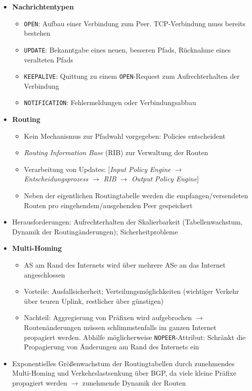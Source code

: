 \begin{itemize}
	\item \textbf{Nachrichtentypen}
	\begin{itemize}
		\item \texttt{OPEN}: Aufbau einer Verbindung zum Peer. TCP-Verbindung muss bereits bestehen
		\item \texttt{UPDATE}: Bekanntgabe eines neuen, besseren Pfads, Rücknahme eines veralteten Pfads
		\item \texttt{KEEPALIVE}: Quittung zu einem \texttt{OPEN}-Request zum Aufrechterhalten der Verbindung
		\item \texttt{NOTIFICATION}: Fehlermeldungen oder Verbindungsabbau
	\end{itemize}
	\item \textbf{Routing}
	\begin{itemize}
		\item Kein Mechanismus zur Pfadwahl vorgegeben: Policies entscheident
		\item \textit{Routing Information Base} (RIB) zur Verwaltung der Routen
		\item Verarbeitung von Updates: \(\big\lbrack\)\textit{Input Policy Engine} \(\rightarrow\) \textit{Entscheidungsprozess} \(\rightarrow\) \textit{RIB} \(\rightarrow\) \textit{Output Policy Engine}\(\big\rbrack\)
		\item Neben der eigentlichen Routingtabelle werden die empfangen/versendeten Routen pro eingehendem/ausgehenden Peer gespeichert
	\end{itemize}
	\item Herausforderungen: Aufrechterhalten der Skalierbarkeit (Tabellenwachstum, Dynamik der Routingänderungen); Sicherheitprobleme
	\item \textbf{Multi-Homing}
	\begin{itemize}
		\item AS am Rand des Internets wird über mehrere ASe an das Internet angeschlossen
		\item Vorteile: Ausfallsicherheit; Verteilungsmöglichkeiten (wichtiger Verkehr über teuren Uplink, restlicher über günstigen)
		\item Nachteil: Aggregierung von Präfixen wird aufgebrochen \(\rightarrow\) Routenänderungen müssen schlimmstenfalls im ganzen Internet propagiert werden. Abhilfe möglicherweise \texttt{NOPEER}-Attribut: Schränkt die Propagierung von Änderungen am Rand des Internets ein
	\end{itemize}
	\item Exponentielles Größenwachstum der Routingtabellen durch zunehmendes Multi-Homing und Verkehrslastsenkung über BGP, da viele kleine Präfixe propagiert werden \(\rightarrow\) zunehmende Dynamik der Routen

\end{itemize}
